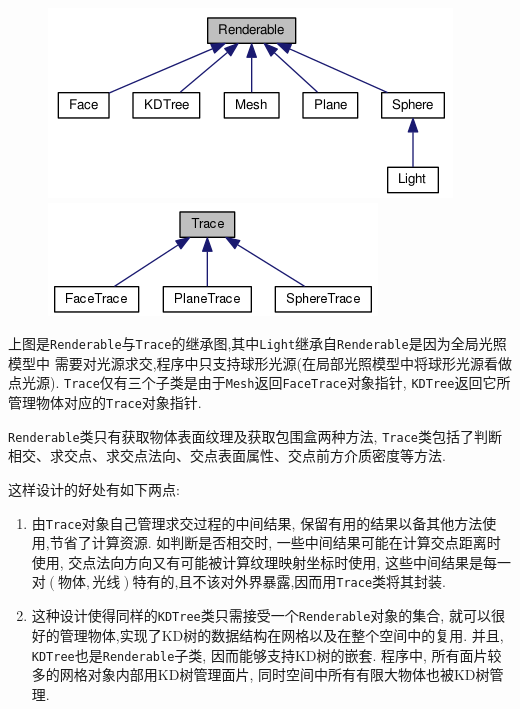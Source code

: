 \begin{figure}[H]
  \begin{minipage}[b]{0.46\linewidth}
    \centering
    \includegraphics[width=\textwidth]{res/renderable_inherit.png}
  \end{minipage}
  \begin{minipage}[b]{0.46\linewidth}
    \centering
    \includegraphics[width=\textwidth]{res/trace_inherit.png}
  \end{minipage}
\end{figure}

上图是\verb|Renderable|与\verb|Trace|的继承图,其中\verb|Light|继承自\verb|Renderable|是因为全局光照模型中
需要对光源求交,程序中只支持球形光源(在局部光照模型中将球形光源看做点光源).
\verb|Trace|仅有三个子类是由于\verb|Mesh|返回\verb|FaceTrace|对象指针, \verb|KDTree|返回它所管理物体对应的\verb|Trace|对象指针.

\verb|Renderable|类只有获取物体表面纹理及获取包围盒两种方法,
\verb|Trace|类包括了判断相交、求交点、求交点法向、交点表面属性、交点前方介质密度等方法.

这样设计的好处有如下两点:

\begin{enumerate}
    \item
      由\verb|Trace|对象自己管理求交过程的中间结果,
      保留有用的结果以备其他方法使用,节省了计算资源.
如判断是否相交时, 一些中间结果可能在计算交点距离时使用, 交点法向方向又有可能被计算纹理映射坐标时使用,
这些中间结果是每一对$ (物体,光线)$特有的,且不该对外界暴露,因而用\verb|Trace|类将其封装.

\item 这种设计使得同样的\verb|KDTree|类只需接受一个\verb|Renderable|对象的集合,
就可以很好的管理物体,实现了KD树的数据结构在网格以及在整个空间中的复用.
并且, \verb|KDTree|也是\verb|Renderable|子类, 因而能够支持KD树的嵌套.
程序中, 所有面片较多的网格对象内部用KD树管理面片,  同时空间中所有有限大物体也被KD树管理.

\end{enumerate}

